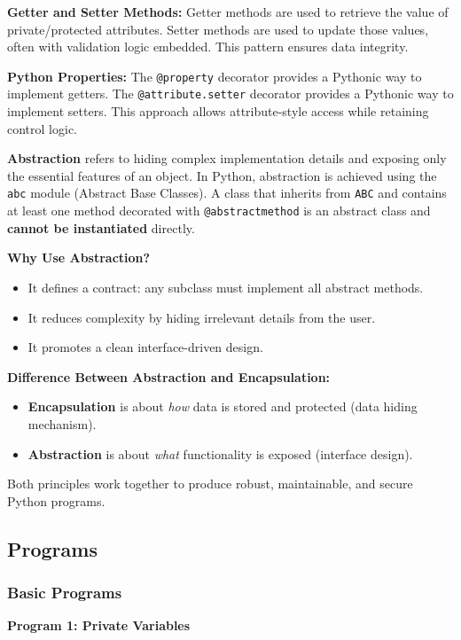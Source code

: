 \documentclass[12pt,a4paper]{article}
\begin{document}
\textbf{Getter and Setter Methods:}
Getter methods are used to retrieve the value of private/protected attributes. Setter methods are used to update those values, often with validation logic embedded. This pattern ensures data integrity.

\textbf{Python Properties:}
The \texttt{@property} decorator provides a Pythonic way to implement getters. The \texttt{@attribute.setter} decorator provides a Pythonic way to implement setters. This approach allows attribute-style access while retaining control logic.

\textbf{Abstraction} refers to hiding complex implementation details and exposing only the essential features of an object. In Python, abstraction is achieved using the \texttt{abc} module (Abstract Base Classes). A class that inherits from \texttt{ABC} and contains at least one method decorated with \texttt{@abstractmethod} is an abstract class and \textbf{cannot be instantiated} directly.

\textbf{Why Use Abstraction?}
\begin{itemize}
  \item It defines a contract: any subclass must implement all abstract methods.
  \item It reduces complexity by hiding irrelevant details from the user.
  \item It promotes a clean interface-driven design.
\end{itemize}

\textbf{Difference Between Abstraction and Encapsulation:}
\begin{itemize}
  \item \textbf{Encapsulation} is about \textit{how} data is stored and protected (data hiding mechanism).
  \item \textbf{Abstraction} is about \textit{what} functionality is exposed (interface design).
\end{itemize}

Both principles work together to produce robust, maintainable, and secure Python programs.

\subsection{Programs}
\subsubsection{Basic Programs}

\textbf{Program 1: Private Variables}
\end{document}
